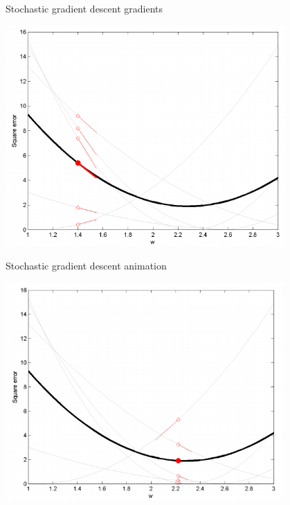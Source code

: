 \documentclass[notes]{beamer}
\begin{document}
\begin{frame}{Stochastic gradient descent gradients}

\centering 

\includegraphics[width=0.80000\textwidth]{2018-03-10-10-01-13.png}\\

\end{frame}

\begin{frame}{Stochastic gradient descent animation}

\centering 

\includegraphics[width=0.80000\textwidth]{2018-03-10-10-01-21.png}\\

\end{frame}
\end{document}

